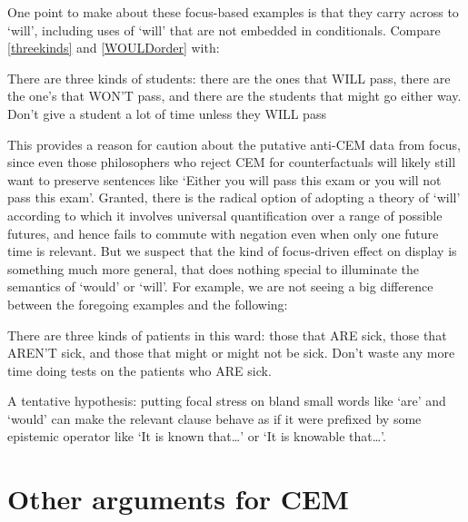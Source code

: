 \documentclass[If.tex]{subfiles}
\begin{document}
One point to make about these focus-based examples is that they carry across to ‘will’, including uses of ‘will’ that are not embedded in conditionals. Compare \ref{threekinds} and \ref{WOULDorder} with:
\begin{prop}
	\nitem
	There are three kinds of students: there are the ones that WILL pass, there are the one's that WON'T pass, and there are the students that might go either way.
	\nitem
	Don't give a student a lot of time unless they WILL pass
\end{prop}
This provides a reason for caution about the putative anti-CEM data from focus, since even those philosophers who reject CEM for counterfactuals will likely still want to preserve sentences like ‘Either you will pass this exam or you will not pass this exam’. Granted, there is the radical option of adopting a theory of ‘will’ according to which it involves universal quantification over a range of possible futures, and hence fails to commute with negation even when only one future time is relevant. But we suspect that the kind of focus-driven effect on display is something much more general, that does nothing special to illuminate the semantics of ‘would’ or ‘will’. For example, we are not seeing a big difference between the foregoing examples and the following:
\begin{prop}
	\nitem \label{sick}
	There are three kinds of patients in this ward: those that ARE sick, those that AREN'T sick, and those that might or might not be sick.
	\nitem
	Don't waste any more time doing tests on the patients who ARE sick.
\end{prop}
A tentative hypothesis: putting focal stress on bland small words like ‘are’ and ‘would’ can make the relevant clause behave as if it were prefixed by some epistemic operator like ‘It is known that\ldots{}’ or ‘It is knowable that\ldots{}’.%

\section{Other arguments for CEM}
\end{document}
